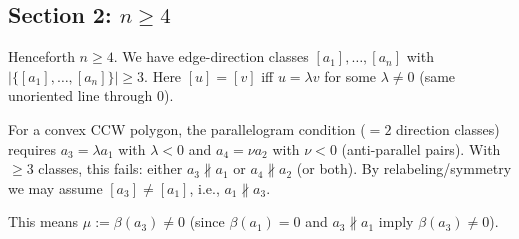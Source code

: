 \bigskip

\subsection*{Section 2: $n \geq 4$}

Henceforth $n \geq 4$.  We have edge-direction classes $[a_1],\ldots,[a_n]$ with
$|\{[a_1],\ldots,[a_n]\}| \geq 3$.  Here $[u] = [v]$ iff $u = \lambda v$ for some
$\lambda \neq 0$ (same unoriented line through 0).

For a convex CCW polygon, the parallelogram condition ($=2$ direction classes) requires
$a_3 = \lambda a_1$ with $\lambda < 0$ and $a_4 = \nu a_2$ with $\nu < 0$ (anti-parallel
pairs).  With $\geq 3$ classes, this fails: either $a_3 \not\parallel a_1$ or $a_4 \not\parallel a_2$
(or both).  By relabeling/symmetry we may assume $[a_3] \neq [a_1]$, i.e., $a_1 \not\parallel a_3$.

This means $\mu := \beta(a_3) \neq 0$ (since $\beta(a_1)=0$ and $a_3 \not\parallel a_1$
imply $\beta(a_3) \neq 0$).


